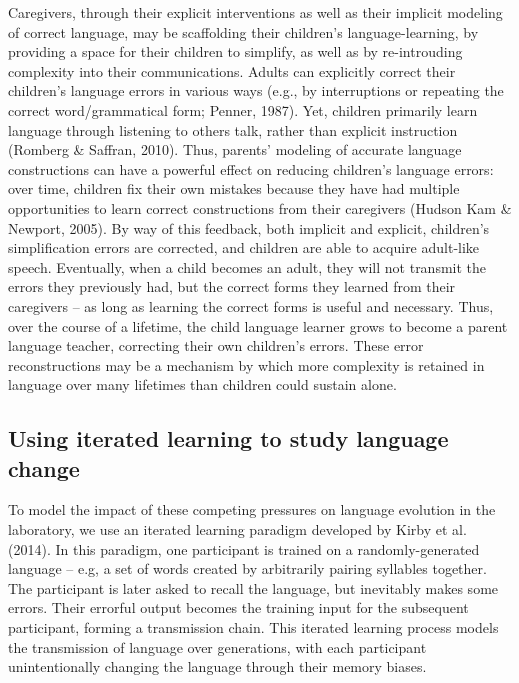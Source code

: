 \documentclass[10pt, letterpaper]{article}
\begin{document}
Caregivers, through their explicit interventions as well as their
implicit modeling of correct language, may be scaffolding their
children's language-learning, by providing a space for their children to
simplify, as well as by re-introuding complexity into their
communications. Adults can explicitly correct their children's language
errors in various ways (e.g., by interruptions or repeating the correct
word/grammatical form; Penner, 1987). Yet, children primarily learn
language through listening to others talk, rather than explicit
instruction (Romberg \& Saffran, 2010). Thus, parents' modeling of
accurate language constructions can have a powerful effect on reducing
children's language errors: over time, children fix their own mistakes
because they have had multiple opportunities to learn correct
constructions from their caregivers (Hudson Kam \& Newport, 2005). By
way of this feedback, both implicit and explicit, children's
simplification errors are corrected, and children are able to acquire
adult-like speech. Eventually, when a child becomes an adult, they will
not transmit the errors they previously had, but the correct forms they
learned from their caregivers -- as long as learning the correct forms
is useful and necessary. Thus, over the course of a lifetime, the child
language learner grows to become a parent language teacher, correcting
their own children's errors. These error reconstructions may be a
mechanism by which more complexity is retained in language over many
lifetimes than children could sustain alone.

\subsection{Using iterated learning to study language
change}\label{using-iterated-learning-to-study-language-change}

To model the impact of these competing pressures on language evolution
in the laboratory, we use an iterated learning paradigm developed by
Kirby et al. (2014). In this paradigm, one participant is trained on a
randomly-generated language -- e.g, a set of words created by
arbitrarily pairing syllables together. The participant is later asked
to recall the language, but inevitably makes some errors. Their errorful
output becomes the training input for the subsequent participant,
forming a transmission chain. This iterated learning process models the
transmission of language over generations, with each participant
unintentionally changing the language through their memory biases.
\end{document}
